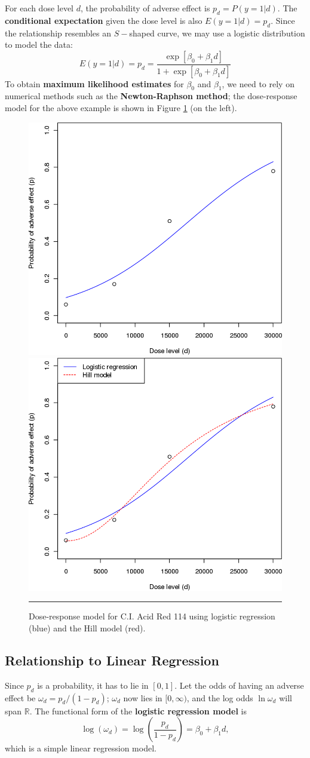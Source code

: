 \newl For each dose level $d$, the probability of adverse effect is $p_{d}=P(y=1|d)$. The \textbf{conditional expectation} given the dose level is also $E(y=1|d)=p_{d}$. Since the relationship resembles an $S-$shaped curve, we may use a  logistic distribution to model the data:
\begin{equation*}
    E(y=1|d)=p_{d}=\frac{\exp[\beta_{0}+\beta_{1}d]}{1+\exp[\beta_{0}+\beta_{1}d]}
\end{equation*}
To obtain \textbf{maximum likelihood estimates} for $\beta_{0}$ and $\beta_{1}$, we need to rely on numerical methods such as the \textbf{Newton-Raphson method}; the dose-response model for the above example is shown in Figure \ref{fig:testA8} (on the left).

\begin{figure}[!t]
\centering
  \includegraphics[width=0.48\linewidth]{Images/testA8.png} \quad  \includegraphics[width=0.48\linewidth]{Images/testA9.png}
  \caption{\small Dose-response model for C.I. Acid Red 114 using logistic regression (blue) and the Hill model (red).}
  \label{fig:testA8}\hrule
\end{figure}
\subsection{Relationship to Linear Regression}
Since $p_{d}$ is a probability, it has to lie in $[0,1]$. Let the odds of having an adverse effect be $\omega_{d}=p_{d}/(1-p_{d})$; $\omega_d$ now lies in $[0,\infty)$, and the log odds $\ln \omega_d$ will span $\mathbb{R}$. The functional form of the \textbf{logistic regression model} is 
$$
    \log(\omega_{d})=\log\left(\frac{p_{d}}{1-p_{d}}\right)=\beta_{0}+\beta_{1}d,
$$
which is a simple linear regression model.

